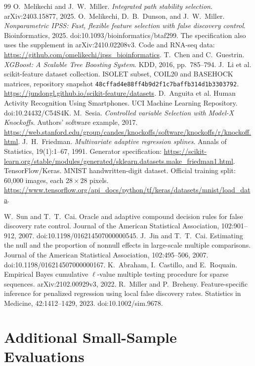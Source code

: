 \documentclass[10pt,letterpaper]{article}
\newcommand{\code}[1]{\nolinkurl{#1}}
\begin{document}
\begingroup\small
\begin{thebibliography}{99}
 O.~Melikechi and J.~W.~Miller.
\emph{Integrated path stability selection}. arXiv:2403.15877, 2025.
 O.~Melikechi, D.~B.~Dunson, and J.~W.~Miller.
\emph{Nonparametric IPSS: Fast, flexible feature selection with false discovery control}.
Bioinformatics, 2025. doi:10.1093/bioinformatics/btaf299.
The specification also uses the supplement in arXiv:2410.02208v3.
Code and RNA-seq data: \url{https://github.com/omelikechi/ipss_bioinformatics}.
 T.~Chen and C.~Guestrin.
\emph{XGBoost: A Scalable Tree Boosting System}. KDD, 2016, pp.~785--794.
 J.~Li et al. scikit-feature dataset collection.
ISOLET subset, COIL20 and BASEHOCK matrices, repository snapshot
\code{48cffad4e88ff4b9d2f1c7baffb314d1b3303792}.
\url{https://jundongl.github.io/scikit-feature/datasets}.
 D.~Anguita et al. Human Activity Recognition Using Smartphones.
UCI Machine Learning Repository. doi:10.24432/C54S4K.
 M.~Sesia. \emph{Controlled variable Selection with Model-X Knockoffs}.
Authors' software example, 2017.
\url{https://web.stanford.edu/group/candes/knockoffs/software/knockoffs/r/knockoff.html}.
 J.~H.~Friedman. \emph{Multivariate adaptive regression splines}.
Annals of Statistics, 19(1):1--67, 1991. Generator specification:
\url{https://scikit-learn.org/stable/modules/generated/sklearn.datasets.make_friedman1.html}.
 TensorFlow/Keras. MNIST handwritten-digit dataset.
Official training split: 60,000 images, each $28\times28$ pixels.
\url{https://www.tensorflow.org/api_docs/python/tf/keras/datasets/mnist/load_data}.

 W.~Sun and T.~T.~Cai. Oracle and adaptive compound decision rules for false discovery rate control.
Journal of the American Statistical Association, 102:901--912, 2007. doi:10.1198/016214507000000545.
 J.~Jin and T.~T.~Cai. Estimating the null and the proportion of nonnull effects in large-scale multiple comparisons.
Journal of the American Statistical Association, 102:495--506, 2007. doi:10.1198/016214507000000167.
 K.~Abraham, I.~Castillo, and E.~Roquain. Empirical Bayes cumulative $\ell$-value multiple testing procedure for sparse sequences.
arXiv:2102.00929v3, 2022.
 R.~Miller and P.~Breheny. Feature-specific inference for penalized regression using local false discovery rates.
Statistics in Medicine, 42:1412--1429, 2023. doi:10.1002/sim.9678.
\end{thebibliography}
\endgroup
\newpage\appendix\section{Additional Small-Sample Evaluations}
\end{document}
